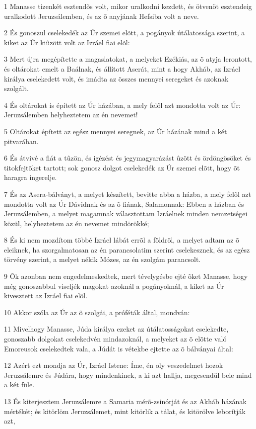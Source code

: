 \par 1 Manasse tizenkét esztendõs volt, mikor uralkodni kezdett, és ötvenöt esztendeig uralkodott Jeruzsálemben, és az õ anyjának Hefsiba volt a neve.
\par 2 És gonoszul cselekedék az Úr szemei elõtt, a pogányok útálatossága szerint, a kiket az Úr kiûzött volt az Izráel fiai elõl:
\par 3 Mert újra megépítette a magaslatokat, a melyeket Ezékiás, az õ atyja lerontott, és oltárokat emelt a Baálnak, és állított Aserát,  mint a hogy Akháb, az Izráel királya cselekedett volt, és imádta az összes mennyei seregeket és azoknak szolgált.
\par 4 És oltárokat is épített az Úr házában, a mely felõl azt mondotta volt az Úr: Jeruzsálemben helyheztetem az én nevemet!
\par 5 Oltárokat épített az egész mennyei seregnek, az Úr házának mind a két pitvarában.
\par 6 És átvivé a fiát a tûzön, és igézést és jegymagyarázást ûzött és ördöngösöket és titokfejtõket  tartott; sok gonosz dolgot cselekedék az Úr szemei elõtt, hogy õt haragra ingerelje.
\par 7 És az Asera-bálványt, a melyet készített, bevitte abba a házba, a mely felõl azt mondotta volt az Úr Dávidnak és az õ fiának, Salamonnak: Ebben a házban és Jeruzsálemben, a melyet magamnak választottam Izráelnek minden nemzetségei közül, helyheztetem az én nevemet mindörökké;
\par 8 És ki nem mozdítom többé Izráel lábát errõl a földrõl, a melyet adtam az õ eleiknek, ha szorgalmatosan az én parancsolatim szerint cselekesznek, és az egész törvény szerint, a melyet nékik Mózes, az én szolgám parancsolt.
\par 9 Õk azonban nem engedelmeskedtek, mert tévelygésbe ejté õket Manasse, hogy még gonoszabbul viseljék magokat azoknál a pogányoknál, a kiket az Úr kivesztett az Izráel fiai elõl.
\par 10 Akkor szóla az Úr az õ szolgái, a próféták által, mondván:
\par 11 Mivelhogy Manasse, Júda királya ezeket az útálatosságokat cselekedte, gonoszabb dolgokat cselekedvén mindazoknál, a melyeket az õ elõtte való Emoreusok cselekedtek vala, a Júdát is vétekbe ejtette az õ bálványai által:
\par 12 Azért ezt mondja az Úr, Izráel Istene: Íme, én oly veszedelmet hozok Jeruzsálemre és Júdára, hogy mindenkinek, a ki azt hallja, megcsendül bele mind a két füle.
\par 13 És kiterjesztem Jeruzsálemre a Samaria mérõ-zsinórját és az Akháb házának mértékét;  és kitörlöm Jeruzsálemet, mint kitörlik a tálat, és kitörölve leborítják azt,
